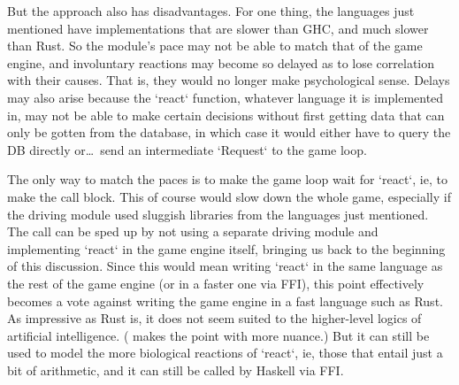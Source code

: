 But the approach also has disadvantages.
For one thing, the languages just mentioned have implementations that are
slower than GHC, and much slower than Rust.
So the module's
pace may not be able to match that of the game engine, and involuntary
reactions may become so delayed as to lose correlation with their causes.
That is, they would no longer make psychological sense.
Delays may also arise because the `react` function, whatever language it is
implemented in,
may not be able to make certain decisions without first getting data that
can only be gotten from the database, in which case it would either have to
query the DB directly or\ldots\ send an intermediate `Request` to the game loop.

The only way to match the paces is to make the game loop wait for `react`,
ie, to make the call block.
This of course would slow down the whole game,
especially if the driving module used sluggish libraries from the languages
just mentioned.
The call can be sped up by not using a separate driving module
and implementing `react` in the game engine itself, bringing us back to the
beginning of this discussion.
Since this would mean writing `react` in
the same language as the rest of the game engine (or in a faster one via FFI),
this point effectively becomes a vote against writing the game engine
in a fast language such as Rust.
As impressive as Rust is, it does not seem suited to the higher-level logics of
artificial intelligence.
(
makes the point with more nuance.) But it can still be used to model the more
biological reactions of `react`, ie, those that entail just a bit of arithmetic,
and it can still be called by Haskell via FFI\@.